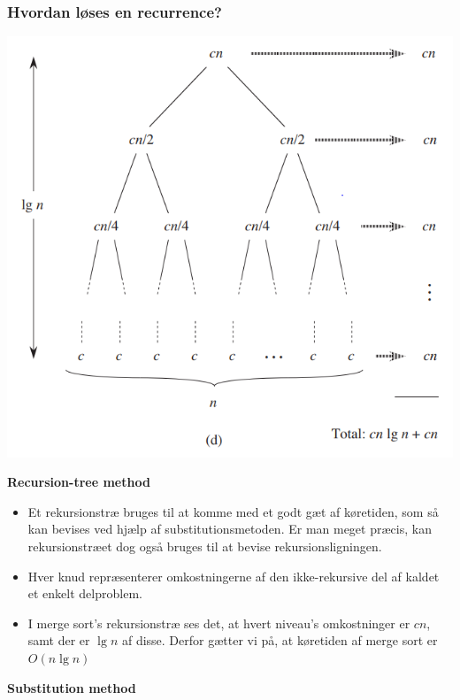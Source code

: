 \documentclass{article}
\begin{document}
\subsubsection*{Hvordan løses en recurrence?}
\begin{center}
    \includegraphics[width = 10 cm]{../entities/merge_sort_recursion_tree.png}
\end{center}
\textbf{Recursion-tree method}
\begin{itemize}
    \item Et rekursionstræ bruges til at komme med et godt gæt af køretiden, som så kan bevises ved hjælp af substitutionsmetoden. Er man meget præcis, kan rekursionstræet dog også bruges til at bevise rekursionsligningen.
    \item Hver knud repræsenterer omkostningerne af den ikke-rekursive del af kaldet et enkelt delproblem.
    \item I merge sort's rekursionstræ ses det, at hvert niveau's omkostninger er $cn$, samt der er $\lg n$ af disse. Derfor gætter vi på, at køretiden af merge sort er $O(n \lg n)$
\end{itemize}
\textbf{Substitution method}
\end{document}
